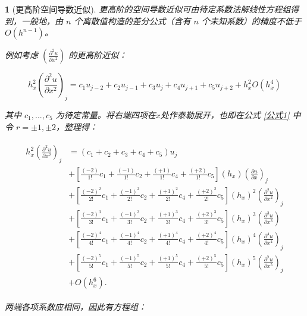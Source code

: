 \documentclass[zihao=5,UTF8]{report}
\theoremstyle{MyTheoremStyle} %
\theoremstyle{MySubsubsectionStyle} %
\newtheorem{definition}{}
\begin{document}
\begin{definition}[更高阶空间导数近似]

更高阶的空间导数近似可由待定系数法解线性方程组得到，一般地，由 $n$ 个离散值构造的差分公式（含有 $n$ 个未知系数）的精度不低于 $O(h^{n-1})$。

例如考虑 $\left(\frac{\partial^2u}{\partial x^2}\right)$ 的更高阶近似：

\begin{equation}\label{公式4}
    h_x^2\left(\frac{\partial^2u}{\partial x^2}\right)_j=c_1u_{j-2}+c_2u_{j-1}+c_3u_j+c_4u_{j+1}+c_5u_{j+2} + h_x^2O(h_x^4)
\end{equation}

其中 $c_1, ...,c_5$ 为待定常量。将右端四项在$x$处作泰勒展开，也即在公式 \ref{公式1} 中令 $r = \pm 1 , \pm 2$，整理得：

\begin{align}
    \begin{aligned}
        h_x^{2}\left(\frac{\partial^{2}u}{\partial x^{2}}\right)_{j}& =(c_1+c_2+c_3+c_4+c_5)u_j  \\
        &+\left[\frac{(-2)}{1!}c_1+\frac{(-1)}{1!}c_2+\frac{(+1)}{1!}c_4+\frac{(+2)}{1!}c_5\right](h_x)\left(\frac{\partial u}{\partial x}\right)_j \\
        &+\left[\frac{(-2)^2}{2!}c_1+\frac{(-1)^2}{2!}c_2+\frac{(+1)^2}{2!}c_4+\frac{(+2)^2}{2!}c_5\right](h_x)^2\left(\frac{\partial^2u}{\partial x^2}\right)_j \\
        &+\left[\frac{(-2)^3}{3!}c_1+\frac{(-1)^3}{3!}c_2+\frac{(+1)^3}{3!}c_4+\frac{(+2)^3}{3!}c_5\right](h_x)^3\left(\frac{\partial^3u}{\partial x^3}\right) \\
        &+\left[\frac{(-2)^4}{4!}c_1+\frac{(-1)^4}{4!}c_2+\frac{(+1)^4}{4!}c_4+\frac{(+2)^4}{4!}c_5\right](h_x)^4\left(\frac{\partial^4u}{\partial x^4}\right)_j \\
        &+\left[\frac{(-2)^{5}}{5!}c_{1}+\frac{(-1)^{5}}{5!}c_{2}+\frac{(+1)^{5}}{5!}c_{4}+\frac{(+2)^{5}}{5!}c_{5}\right](h_x)^{5}\left(\frac{\partial^{5}u}{\partial x^{5}}\right)_{j} \\
        &+O(h_x^{6}).
        \end{aligned}
\end{align}

两端各项系数应相同，因此有方程组：


\end{definition}
\end{document}
